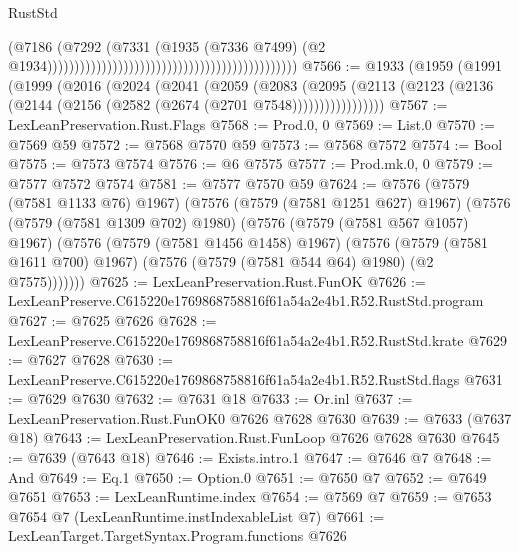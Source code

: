 \begin{lexlean}{RustStd}
\begin{coremodule}
                                                                                      (@7186
                                                                                        (@7292
                                                                                          (@7331
                                                                                            (@1935
                                                                                              (@7336
                                                                                                @7499)
                                                                                              (@2
                                                                                                @1934))))))))))))))))))))))))))))))))))))))))))))))
@7566 := @1933
    (@1959
      (@1991
        (@1999
          (@2016
            (@2024
              (@2041
                (@2059
                  (@2083
                    (@2095
                      (@2113 (@2123 (@2136 (@2144 (@2156 (@2582 (@2674 (@2701 @7548)))))))))))))))))
@7567 := LexLeanPreservation.Rust.Flags
@7568 := Prod.{0, 0}
@7569 := List.{0}
@7570 := @7569 @59
@7572 := @7568 @7570 @59
@7573 := @7568 @7572
@7574 := Bool
@7575 := @7573 @7574
@7576 := @6 @7575
@7577 := Prod.mk.{0, 0}
@7579 := @7577 @7572 @7574
@7581 := @7577 @7570 @59
@7624 := @7576
    (@7579 (@7581 @1133 @76) @1967)
    (@7576
      (@7579 (@7581 @1251 @627) @1967)
      (@7576
        (@7579 (@7581 @1309 @702) @1980)
        (@7576
          (@7579 (@7581 @567 @1057) @1967)
          (@7576
            (@7579 (@7581 @1456 @1458) @1967)
            (@7576
              (@7579 (@7581 @1611 @700) @1967)
              (@7576 (@7579 (@7581 @544 @64) @1980) (@2 @7575)))))))
@7625 := LexLeanPreservation.Rust.FunOK
@7626 := LexLeanPreserve.C615220e1769868758816f61a54a2e4b1.R52.RustStd.program
@7627 := @7625 @7626
@7628 := LexLeanPreserve.C615220e1769868758816f61a54a2e4b1.R52.RustStd.krate
@7629 := @7627 @7628
@7630 := LexLeanPreserve.C615220e1769868758816f61a54a2e4b1.R52.RustStd.flags
@7631 := @7629 @7630
@7632 := @7631 @18
@7633 := Or.inl
@7637 := LexLeanPreservation.Rust.FunOK0 @7626 @7628 @7630
@7639 := @7633 (@7637 @18)
@7643 := LexLeanPreservation.Rust.FunLoop @7626 @7628 @7630
@7645 := @7639 (@7643 @18)
@7646 := Exists.intro.{1}
@7647 := @7646 @7
@7648 := And
@7649 := Eq.{1}
@7650 := Option.{0}
@7651 := @7650 @7
@7652 := @7649 @7651
@7653 := LexLeanRuntime.index
@7654 := @7569 @7
@7659 := @7653 @7654 @7 (LexLeanRuntime.instIndexableList @7)
@7661 := LexLeanTarget.TargetSyntax.Program.functions @7626

\end{coremodule}
\end{lexlean}
